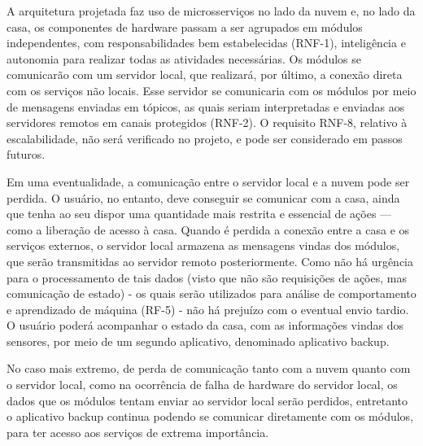 A arquitetura projetada faz uso de microsserviços no lado da nuvem e, no lado da casa, os componentes de hardware passam a ser agrupados em módulos independentes, com responsabilidades bem estabelecidas (RNF-1), inteligência e autonomia para realizar todas as atividades necessárias. Os módulos se comunicarão com um servidor local, que realizará, por último, a conexão direta com os serviços não locais. Esse servidor se comunicaria com os módulos por meio de mensagens enviadas em tópicos, as quais seriam interpretadas e enviadas aos servidores remotos em canais protegidos (RNF-2). O requisito RNF-8, relativo à escalabilidade, não será verificado no projeto, e pode ser considerado em passos futuros.

Em uma eventualidade, a comunicação entre o servidor local e a nuvem pode ser perdida.  O usuário, no entanto, deve conseguir se comunicar com a casa, ainda que tenha ao seu dispor uma quantidade mais restrita e essencial de ações --- como a liberação de acesso à casa. Quando é perdida a conexão entre a casa e os serviços externos, o servidor local armazena as mensagens vindas dos módulos, que serão transmitidas ao servidor remoto posteriormente. Como não há urgência para o processamento de tais dados (visto que não são requisições de ações, mas comunicação de estado) - os quais serão utilizados para análise de comportamento e aprendizado de máquina (RF-5) - não há prejuízo com o eventual envio tardio. O usuário poderá acompanhar o estado da casa, com as informações vindas dos sensores, por meio de um segundo aplicativo, denominado aplicativo backup.

No caso mais extremo, de perda de comunicação tanto com a nuvem quanto com o servidor local, como na ocorrência de falha de hardware do servidor local, os dados que os módulos tentam enviar ao servidor local serão perdidos, entretanto o aplicativo backup continua podendo se comunicar diretamente com os módulos, para ter acesso aos serviços de extrema importância.
